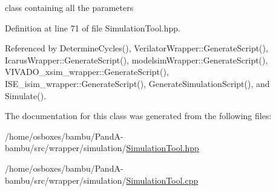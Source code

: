 class containing all the parameters 



Definition at line 71 of file Simulation\+Tool.\+hpp.



Referenced by Determine\+Cycles(), Verilator\+Wrapper\+::\+Generate\+Script(), Icarus\+Wrapper\+::\+Generate\+Script(), modelsim\+Wrapper\+::\+Generate\+Script(), V\+I\+V\+A\+D\+O\+\_\+xsim\+\_\+wrapper\+::\+Generate\+Script(), I\+S\+E\+\_\+isim\+\_\+wrapper\+::\+Generate\+Script(), Generate\+Simulation\+Script(), and Simulate().



The documentation for this class was generated from the following files\+:\begin{DoxyCompactItemize}
\item 
/home/osboxes/bambu/\+Pand\+A-\/bambu/src/wrapper/simulation/\hyperlink{SimulationTool_8hpp}{Simulation\+Tool.\+hpp}\item 
/home/osboxes/bambu/\+Pand\+A-\/bambu/src/wrapper/simulation/\hyperlink{SimulationTool_8cpp}{Simulation\+Tool.\+cpp}\end{DoxyCompactItemize}
